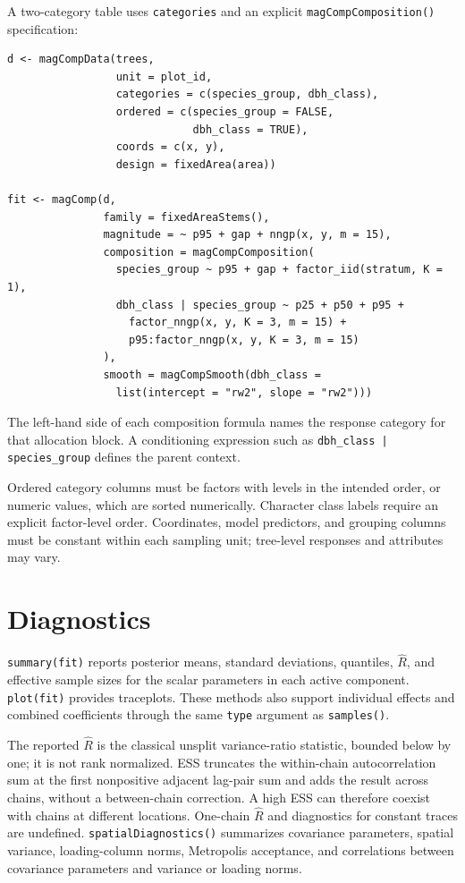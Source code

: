 \documentclass[11pt]{article}
\begin{document}
A two-category table uses \texttt{categories} and an explicit
\texttt{magCompComposition()} specification:
\begin{verbatim}
d <- magCompData(trees,
                 unit = plot_id,
                 categories = c(species_group, dbh_class),
                 ordered = c(species_group = FALSE,
                             dbh_class = TRUE),
                 coords = c(x, y),
                 design = fixedArea(area))

fit <- magComp(d,
               family = fixedAreaStems(),
               magnitude = ~ p95 + gap + nngp(x, y, m = 15),
               composition = magCompComposition(
                 species_group ~ p95 + gap + factor_iid(stratum, K = 1),
                 dbh_class | species_group ~ p25 + p50 + p95 +
                   factor_nngp(x, y, K = 3, m = 15) +
                   p95:factor_nngp(x, y, K = 3, m = 15)
               ),
               smooth = magCompSmooth(dbh_class =
                 list(intercept = "rw2", slope = "rw2")))
\end{verbatim}
The left-hand side of each composition formula names the response category for
that allocation block. A conditioning expression such as
\texttt{dbh\_class | species\_group} defines the parent context.

Ordered category columns must be factors with levels in the intended order,
or numeric values, which are sorted numerically. Character class labels
require an explicit factor-level order. Coordinates, model predictors, and
grouping columns must be constant within each sampling unit; tree-level
responses and attributes may vary.

\section{Diagnostics}
\label{sec:diagnostics}

\texttt{summary(fit)} reports posterior means, standard deviations, quantiles,
\(\widehat{R}\), and effective sample sizes for the scalar parameters in each
active component. \texttt{plot(fit)} provides traceplots. These methods also
support individual effects and combined coefficients through the same
\texttt{type} argument as \texttt{samples()}.

The reported \(\widehat{R}\) is the classical unsplit variance-ratio statistic,
bounded below by one; it is not rank normalized. ESS truncates the within-chain
autocorrelation sum at the first nonpositive adjacent lag-pair sum and adds the
result across chains, without a between-chain correction. A high ESS can
therefore coexist with chains at different locations. One-chain
\(\widehat{R}\) and diagnostics for constant traces are undefined.
\texttt{spatialDiagnostics()} summarizes covariance parameters, spatial variance, loading-column norms, Metropolis acceptance, and correlations
between covariance parameters and variance or loading norms.
\end{document}
